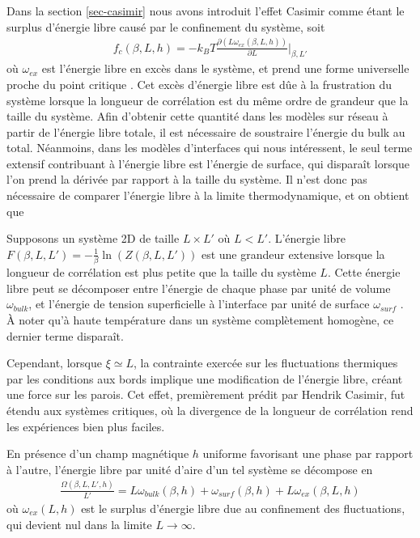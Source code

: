 Dans la section \ref{sec-casimir} nous avons introduit l'effet Casimir comme étant le surplus d'énergie libre causé par le confinement du système, soit 
\begin{align}
    f_c(\beta,L,h) = - k_B T \frac{\partial(L \omega_{ex}(\beta,L,h))}{\partial L}\bigg|_{\beta,L'}
\end{align}
où $\omega_{ex}$ est l'énergie libre en excès dans le système, et prend une forme universelle proche du point critique \cite{casimir-universel}. Cet excès d'énergie libre est dûe à la frustration du système lorsque la longueur de corrélation est du même ordre de grandeur que la taille du système. Afin d'obtenir cette quantité dans les modèles sur réseau à partir de l'énergie libre totale, il est nécessaire de soustraire l'énergie du bulk au total. Néanmoins, dans les modèles d'interfaces qui nous intéressent, le seul terme extensif contribuant à l'énergie libre est l'énergie de surface, qui disparaît lorsque l'on prend la dérivée par rapport à la taille du système. Il n'est donc pas nécessaire de comparer l'énergie libre à la limite thermodynamique, et on obtient que 
 
    
    
Supposons un système 2D de taille $L \times L' $ où $L \less L'$. L'énergie libre $F(\beta,L,L') = - \frac{1}{\beta} \ln ( Z(\beta,L,L'))$ est une grandeur extensive lorsque la longueur de corrélation est plus petite que la taille du système $L$. 
Cette énergie libre peut se décomposer entre l'énergie de chaque phase par unité de volume $\omega_{bulk}$, et l'énergie de tension superficielle à l'interface par unité de surface $\omega_{surf}$ \cite{cardozo_finite_2015,lopes_cardozo_critical_2014}. À noter qu'à haute température dans un système complètement homogène, ce dernier terme disparaît.

Cependant, lorsque $\xi \simeq L$, la contrainte exercée sur les fluctuations thermiques par les conditions aux bords implique une modification de l'énergie libre, créant une force sur les parois. Cet effet, premièrement prédit par Hendrik Casimir\cite{h_b_g_casimir_attraction_1948}, fut étendu aux systèmes critiques\cite{nikolic_is_2017}, où la divergence de la longueur de corrélation rend les expériences bien plus faciles\cite{nguyen_controlling_2013}.

En présence d'un champ magnétique $h$ uniforme favorisant une phase par rapport à l'autre, l'énergie libre par unité d'aire d'un tel système se décompose \cite{lopes_cardozo_critical_2014,cardozo_finite_2015} en 
\begin{align}
    \frac{\Omega(\beta,L,L',h)}{L'} = L \omega_{bulk}(\beta,h) + \omega_{surf}(\beta,h) + L \omega_{ex}(\beta,L,h)
    \label{decomposition-energie}
\end{align}
où $\omega_{ex}(L,h)$ est le surplus d'énergie libre due au confinement des fluctuations, qui devient nul dans la limite $L\to \infty$.

